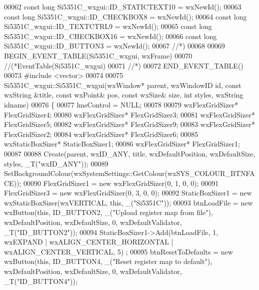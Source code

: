 \begin{DoxyCode}
00062 \textcolor{keyword}{const} \textcolor{keywordtype}{long} Si5351C_wxgui::ID_STATICTEXT10 = wxNewId();
00063 \textcolor{keyword}{const} \textcolor{keywordtype}{long} Si5351C_wxgui::ID_CHECKBOX8 = wxNewId();
00064 \textcolor{keyword}{const} \textcolor{keywordtype}{long} Si5351C_wxgui::ID_TEXTCTRL9 = wxNewId();
00065 \textcolor{keyword}{const} \textcolor{keywordtype}{long} Si5351C_wxgui::ID_CHECKBOX16 = wxNewId();
00066 \textcolor{keyword}{const} \textcolor{keywordtype}{long} Si5351C_wxgui::ID_BUTTON3 = wxNewId();
00067 \textcolor{comment}{//*)}
00068 
00069 BEGIN\_EVENT\_TABLE(Si5351C_wxgui, wxFrame)
00070 \textcolor{comment}{//(*EventTable(Si5351C\_wxgui)}
00071 \textcolor{comment}{//*)}
00072 END\_EVENT\_TABLE()
00073 \textcolor{preprocessor}{#include <vector>}
00074 
00075 Si5351C_wxgui::Si5351C_wxgui(wxWindow* parent, wxWindowID \textcolor{keywordtype}{id}, \textcolor{keyword}{const} wxString &title, \textcolor{keyword}{const} wxPoint& pos, \textcolor{keyword}{
      const} wxSize& size, \textcolor{keywordtype}{int} styles, wxString idname)
00076 \{
00077     lmsControl = NULL;
00078 
00079     wxFlexGridSizer* FlexGridSizer4;
00080     wxFlexGridSizer* FlexGridSizer3;
00081     wxFlexGridSizer* FlexGridSizer5;
00082     wxFlexGridSizer* FlexGridSizer9;
00083     wxFlexGridSizer* FlexGridSizer2;
00084     wxFlexGridSizer* FlexGridSizer6;
00085     wxStaticBoxSizer* StaticBoxSizer1;
00086     wxFlexGridSizer* FlexGridSizer1;
00087 
00088     Create(parent, wxID\_ANY, title, wxDefaultPosition, wxDefaultSize, styles, _T(\textcolor{stringliteral}{"wxID\_ANY"}));
00089     SetBackgroundColour(wxSystemSettings::GetColour(wxSYS\_COLOUR\_BTNFACE));
00090     FlexGridSizer1 = \textcolor{keyword}{new} wxFlexGridSizer(0, 1, 0, 0);
00091     FlexGridSizer3 = \textcolor{keyword}{new} wxFlexGridSizer(0, 3, 0, 0);
00092     StaticBoxSizer1 = \textcolor{keyword}{new} wxStaticBoxSizer(wxVERTICAL, \textcolor{keyword}{this}, \_(\textcolor{stringliteral}{"Si5351C"}));
00093     btnLoadFile = \textcolor{keyword}{new} wxButton(\textcolor{keyword}{this}, ID\_BUTTON2, \_(\textcolor{stringliteral}{"Upload register map from file"}), wxDefaultPosition, 
      wxDefaultSize, 0, wxDefaultValidator, _T(\textcolor{stringliteral}{"ID\_BUTTON2"}));
00094     StaticBoxSizer1->Add(btnLoadFile, 1, wxEXPAND | wxALIGN\_CENTER\_HORIZONTAL | wxALIGN\_CENTER\_VERTICAL, 5)
      ;
00095     btnResetToDefaults = \textcolor{keyword}{new} wxButton(\textcolor{keyword}{this}, ID\_BUTTON4, \_(\textcolor{stringliteral}{"Reset register map to default"}), 
      wxDefaultPosition, wxDefaultSize, 0, wxDefaultValidator, _T(\textcolor{stringliteral}{"ID\_BUTTON4"}));

\end{DoxyCode}
